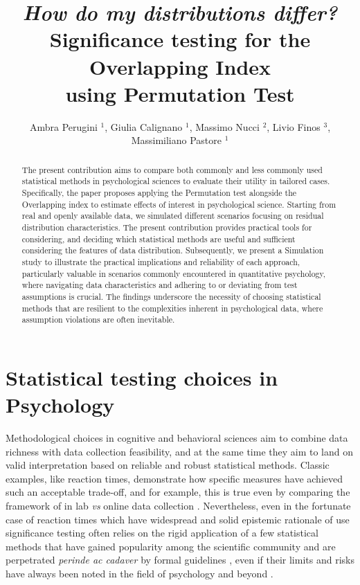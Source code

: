 \documentclass[twocolumn]{article}\usepackage[]{graphicx}\usepackage[]{xcolor}
\begin{document}
\title{\textbf{\textit{How do my distributions differ?} \\ Significance testing for the Overlapping Index \\ using Permutation Test}} %
\author{Ambra Perugini $^1$, Giulia Calignano $^1$, Massimo Nucci $^2$, Livio Finos $^3$, Massimiliano Pastore $^1$}

\maketitle



\begin{abstract}
The present contribution aims to compare both commonly and less commonly used statistical methods in psychological sciences to evaluate their utility in tailored cases. Specifically, the paper proposes applying the Permutation test alongside the Overlapping index to estimate effects of interest in psychological science. Starting from real and openly available data, we simulated different scenarios focusing on residual distribution characteristics.  The present contribution provides practical tools for considering, and deciding which statistical methods are useful and sufficient considering the features of data distribution. Subsequently, we present a Simulation study to illustrate the practical implications and reliability of each approach, particularly valuable in scenarios commonly encountered in quantitative psychology, where navigating data characteristics and adhering to or deviating from test assumptions is crucial. The findings underscore the necessity of choosing statistical methods that are resilient to the complexities inherent in psychological data, where assumption violations are often inevitable.
\end{abstract}

\section{Statistical testing choices in Psychology}

    Methodological choices in cognitive and behavioral sciences aim to combine data richness with data collection feasibility, and at the same time they aim to land on valid interpretation based on reliable and robust statistical methods. Classic examples, like reaction times, demonstrate how specific measures have achieved such an acceptable trade-off, and for example, this is true even by comparing the framework of in lab \textit{vs} online data collection \cite{semmelmann2017online}. Nevertheless, even in the fortunate case of reaction times which have widespread and solid epistemic rationale of use \cite{grosjean2001timing, proctor2018hick, silverman2010simple} significance testing often relies on the rigid application of a few statistical methods that have gained popularity among the scientific community and are perpetrated \textit{perinde ac cadaver} by formal guidelines \cite{cumming2012statistical}, even if their limits and risks have always been noted in the field of psychology and beyond \cite{boneau1960effects}. 
    
\end{document}
